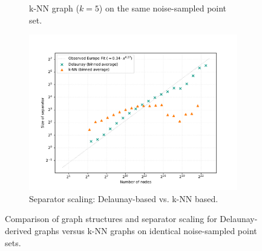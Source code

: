 \begin{figure}[tbhp]
\begin{subfigure}{0.27\linewidth}
        \caption{k-NN graph (\(k=5\)) on the same noise-sampled point set.}
        \label{fig:knn_noise_graph_viz_comp}
    \end{subfigure}
    \hfill
    \begin{subfigure}{0.4\linewidth}
        \centering
        \includegraphics[width=\linewidth]{graphics/noise_knn_vs_rng.pdf}
        \caption{Separator scaling: Delaunay-based vs. k-NN based.}
        \label{fig:knn_delaunay_noise_sep_compare}
    \end{subfigure}
    \caption{Comparison of graph structures and separator scaling for Delaunay-derived graphs versus k-NN graphs on identical noise-sampled point sets.}
    \label{fig:knn_vs_delaunay_noise_points}
\end{figure}


